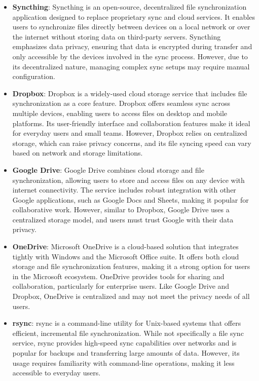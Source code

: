 \documentclass{book}
\begin{document}
    \begin{itemize}
      \item \textbf{Syncthing}: Syncthing is an open-source, decentralized file synchronization application designed to replace proprietary sync and cloud services. It enables users to synchronize files directly between devices on a local network or over the internet without storing data on third-party servers. Syncthing emphasizes data privacy, ensuring that data is encrypted during transfer and only accessible by the devices involved in the sync process. However, due to its decentralized nature, managing complex sync setups may require manual configuration.

      \item \textbf{Dropbox}: Dropbox is a widely-used cloud storage service that includes file synchronization as a core feature. Dropbox offers seamless sync across multiple devices, enabling users to access files on desktop and mobile platforms. Its user-friendly interface and collaboration features make it ideal for everyday users and small teams. However, Dropbox relies on centralized storage, which can raise privacy concerns, and its file syncing speed can vary based on network and storage limitations.

      \item \textbf{Google Drive}: Google Drive combines cloud storage and file synchronization, allowing users to store and access files on any device with internet connectivity. The service includes robust integration with other Google applications, such as Google Docs and Sheets, making it popular for collaborative work. However, similar to Dropbox, Google Drive uses a centralized storage model, and users must trust Google with their data privacy.

      \item \textbf{OneDrive}: Microsoft OneDrive is a cloud-based solution that integrates tightly with Windows and the Microsoft Office suite. It offers both cloud storage and file synchronization features, making it a strong option for users in the Microsoft ecosystem. OneDrive provides tools for sharing and collaboration, particularly for enterprise users. Like Google Drive and Dropbox, OneDrive is centralized and may not meet the privacy needs of all users.

      \item \textbf{rsync}: rsync is a command-line utility for Unix-based systems that offers efficient, incremental file synchronization. While not specifically a file sync service, rsync provides high-speed sync capabilities over networks and is popular for backups and transferring large amounts of data. However, its usage requires familiarity with command-line operations, making it less accessible to everyday users. 


\end{itemize}
\end{document}
